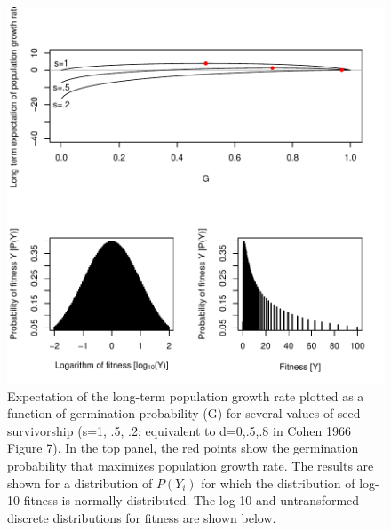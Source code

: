 \documentclass[12pt, oneside, titlepage]{article}   	%
\begin{document}
%
 \begin{figure}[h]
   \centering
       \includegraphics[page=1]{../figures/appendix-x-optimal.pdf}  
    \caption{ Expectation of the long-term population growth rate plotted as a function of germination probability (G) for several values of seed survivorship (s=1, .5, .2; equivalent to d=0,.5,.8 in Cohen 1966 Figure 7). In the top panel, the red points show the germination probability that maximizes population growth rate. The results are shown for a distribution of $P(Y_i)$ for which the distribution of log-10 fitness is normally distributed. The log-10 and untransformed discrete distributions for fitness are shown below.  }
 \label{fig:optimal_g}
\end{figure}
%
\end{document}
